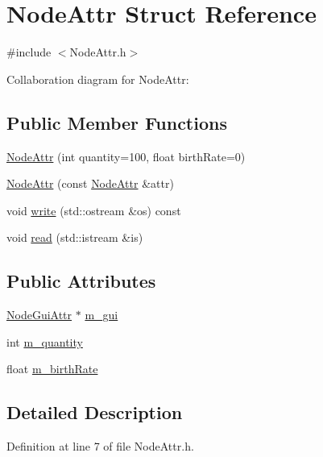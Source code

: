 \hypertarget{struct_node_attr}{}\section{Node\+Attr Struct Reference}
\label{struct_node_attr}


{\ttfamily \#include $<$Node\+Attr.\+h$>$}



Collaboration diagram for Node\+Attr\+:
\subsection*{Public Member Functions}
\begin{DoxyCompactItemize}
\item 
\mbox{\hyperlink{struct_node_attr_a8e2bb0b1d6c9a9463c8c889c449bf25d}{Node\+Attr}} (int quantity=100, float birth\+Rate=0)
\item 
\mbox{\hyperlink{struct_node_attr_a212fd175b38b0d487ca604f096486afc}{Node\+Attr}} (const \mbox{\hyperlink{struct_node_attr}{Node\+Attr}} \&attr)
\item 
void \mbox{\hyperlink{struct_node_attr_a689f2d11e05d5cbf82f8b4ddff2dc658}{write}} (std\+::ostream \&os) const
\item 
void \mbox{\hyperlink{struct_node_attr_a33c9654fe14019595e13bab7dde6cfdc}{read}} (std\+::istream \&is)
\end{DoxyCompactItemize}
\subsection*{Public Attributes}
\begin{DoxyCompactItemize}
\item 
\mbox{\hyperlink{struct_node_gui_attr}{Node\+Gui\+Attr}} $\ast$ \mbox{\hyperlink{struct_node_attr_ab879f09d2cedd542d240f529062c495f}{m\+\_\+gui}}
\item 
int \mbox{\hyperlink{struct_node_attr_a4f41a824fc2c1c549673ee35999b1133}{m\+\_\+quantity}}
\item 
float \mbox{\hyperlink{struct_node_attr_a9bd12eee0adc8d7a8686d425d749ada8}{m\+\_\+birth\+Rate}}
\end{DoxyCompactItemize}


\subsection{Detailed Description}


Definition at line 7 of file Node\+Attr.\+h.



